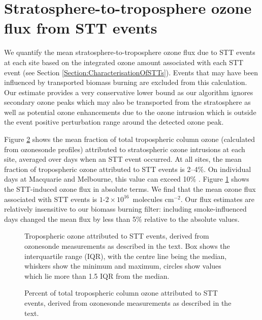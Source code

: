 \section{Stratosphere-to-troposphere ozone flux from STT events}
  
  We quantify the mean stratosphere-to-troposphere ozone flux due to STT events at each site based on the integrated ozone amount associated with each STT event (see Section \ref{Section:CharacterisationOfSTTs}).
  Events that may have been influenced by transported biomass burning are excluded from this calculation.
  Our estimate provides a very conservative lower bound as our algorithm ignores secondary ozone peaks which may also be transported from the stratosphere as well as potential ozone enhancements due to the ozone intrusion which is outside the event positive perturbation range around the detected ozone peak.
  
  Figure \ref{fig:fluxsummary} shows the mean fraction of total tropospheric column ozone (calculated from ozonesonde profiles) attributed to stratospheric ozone intrusions at each site, averaged over days when an STT event occurred.
  At all sites, the mean fraction of tropospheric ozone attributed to STT events is 2--4\%. On individual days at Macquarie and Melbourne, this value can exceed 10\% .
  Figure \ref{fig:fluxsummaryabs} shows the STT-induced ozone flux in absolute terms.
  We find that the mean ozone flux associated with STT events is $1$-$2 \times 10^{16}$~molecules cm$^{-2}$.
  Our flux estimates are relatively insensitive to our biomass burning filter: including smoke-influenced days changed the mean flux by less than 5\% relative to the absolute values.
  
  \begin{figure}[t]
    
    \caption{Tropospheric ozone attributed to STT events, derived from ozonesonde measurements as described in the text.
      Box shows the interquartile range (IQR), with the centre line being the median, whiskers show the minimum and maximum, circles show values which lie more than 1.5 IQR from the median.}
    \label{fig:fluxsummaryabs}
    
  \end{figure}
  \begin{figure}[t]
    \begin{center}
    \caption{Percent of total tropospheric column ozone attributed to STT events, derived from ozonesonde measurements as described in the text.}
    \label{fig:fluxsummary}
    \end{center}
  \end{figure}
  
